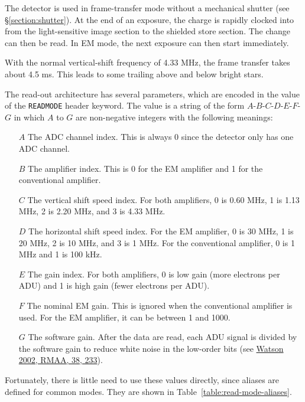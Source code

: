 The detector is used in frame-transfer mode without a mechanical shutter (see \S\ref{section:shutter}). At the end of an exposure, the charge is rapidly clocked into from the light-sensitive image section to the shielded store section. The change can then be read. In EM mode, the next exposure can then start immediately.

With the normal vertical-shift frequency of 4.33 MHz, the frame transfer takes about 4.5 ms. This leads to some trailing above and below bright stars.

The read-out architecture has several parameters, which are encoded in the value of the \verb|READMODE| header keyword. The value is a string of the form $A$-$B$-$C$-$D$-$E$-$F$-$G$ in which $A$ to $G$ are non-negative integers with the following meanings:

\begin{itemize}
\item[$A$] The ADC channel index. This is always 0 since the detector only has one ADC channel.
\item[$B$] The amplifier index. This is 0 for the EM amplifier and 1 for the conventional amplifier.
\item[$C$] The vertical shift speed index. For both amplifiers, 0 is 0.60 MHz, 1 is 1.13 MHz, 2 is 2.20 MHz, and 3 is 4.33 MHz. 
\item[$D$] The horizontal shift speed index. For the EM amplifier, 0 is 30 MHz, 1 is 20 MHz, 2 is 10 MHz, and 3 is 1 MHz. For the conventional amplifier, 0 is 1 MHz and 1 is 100 kHz.
\item[$E$] The gain index. For both amplifiers, 0 is low gain (more electrons per ADU) and 1 is high gain (fewer electrons per ADU).
\item[$F$] The nominal EM gain. This is ignored when the conventional amplifier is used. For the EM amplifier, it can be between 1 and 1000.
\item[$G$] The software gain. After the data are read, each ADU signal is divided by the software gain to reduce white noise in the low-order bits (see \href{https://ui.adsabs.harvard.edu/abs/2002RMxAA..38..233W/abstract}{Watson 2002, RMAA, 38, 233}).
\end{itemize}

Fortunately, there is little need to use these values directly, since aliases are defined for common modes. They are shown in Table~\ref{table:read-mode-aliases}.

